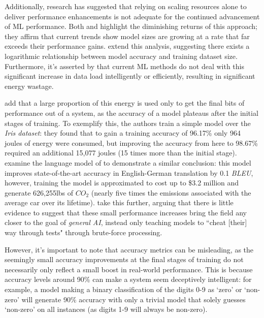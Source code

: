 \documentclass[a4paper, 12pt]{article}
\begin{document}
    Additionally, research has suggested that relying on scaling resources alone to deliver performance enhancements is not adequate for the continued advancement of ML performance. Both \citet{schwartz-2019} and \citet{buchanan-2021} highlight the diminishing returns of this approach; they affirm that current trends show model sizes are growing at a rate that far exceeds their performance gains. \citet{mahajan-2018} extend this analysis, suggesting there exists a logarithmic relationship between model accuracy and training dataset size. Furthermore, it's asserted by \citet{aljarrah-2015} that current ML methods do not deal with this significant increase in data load intelligently or efficiently, resulting in significant energy wastage.

    \citet{sharma-kaulgud-2021} add that a large proportion of this energy is used only to get the final bits of performance out of a system, as the accuracy of a model plateaus after the initial stages of training. To exemplify this, the authors train a simple model over the \emph{Iris dataset}: they found that to gain a training accuracy of 96.17\% only 964 joules of energy were consumed, but improving the accuracy from here to 98.67\% required an additional 15,077 joules (15 times more than the initial stage). \citet{strubell-2019} examine the language model of \citet{so-2019} to demonstrate a similar conclusion: this model improves state-of-the-art accuracy in English-German translation by 0.1 \emph{BLEU}, however, training the model is approximated to cost up to \$3.2 million and generate 626,255lbs of $CO_2$ (nearly five times the emissions associated with the average car over its lifetime). \citet{bender-2021} take this further, arguing that there is little evidence to suggest that these small performance increases bring the field any closer to the goal of \emph{general AI}, instead only teaching models to ``cheat [their] way through tests" through brute-force processing.

    However, it's important to note that accuracy metrics can be misleading, as the seemingly small accuracy improvements at the final stages of training do not necessarily only reflect a small boost in real-world performance. This is because accuracy levels around 90\% can make a system seem deceptively intelligent: for example, a model making a binary classification of the digits 0-9 as `zero' or `non-zero' will generate 90\% accuracy with only a trivial model that solely guesses `non-zero' on all instances (as digits 1-9 will always be non-zero).
\end{document}
